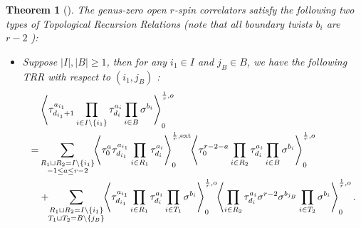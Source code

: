 \documentclass[11pt]{amsart}
\newtheorem{thm}[dummy]{Theorem}
\theoremstyle{definition}
\theoremstyle{remark}
\newcommand{\<}{\left<}
\renewcommand{\>}{\right>}
\numberwithin{equation}{section}
\begin{document}
    \begin{thm}[{\cite[Theorem 4.1]{BCT2}}]\label{thm TRR BCT}
    The genus-zero open $r$-spin correlators satisfy the following two types of Topological Recursion Relations (note that all boundary twists $b_i$ are $r-2$%
):
\begin{itemize}
\item[(a)] Suppose $\lvert I \rvert, \lvert B \rvert\ge 1$, then for any $i_1\in I$ and $j_B\in B$, we have the following %
TRR with respect to $(i_1,j_B)$%
:
\begin{equation}\label{eq: bct trr 1}
\begin{split}
&\left\langle \tau_{d_{i_1}+1}^{a_{i_1}}\prod_{i\in I\setminus \{i_1\}}\tau^{a_i}_{d_i}\prod_{i\in B}\sigma^{b_i}\right\rangle^{\frac{1}{r},o}_0\hspace{-0.2cm}\\
=&\sum_{\substack{R_1 \sqcup R_2 = I \setminus \{{i_1}\}\\ -1\le a \le r-2}}\hspace{-0.1cm}\left\langle \tau_0^{a}\tau_{d_{i_1}}^{a_{i_1}}\prod_{i \in R_1}\tau_{d_i}^{a_i}\right\rangle^{\frac{1}{r},\text{ext}}_0
\hspace{-0.1cm}\left\langle \tau_0^{r-2-a}\prod_{i\in R_2}\tau^{a_i}_{d_i}\prod_
{i\in B}\sigma^{b_i}\right\rangle^{\frac{1}{r},o}_0\\
&+\hspace{-0.1cm}\sum_{\substack{R_1 \sqcup R_2 =  I \setminus \{{i_1}\} \\ T_1 \sqcup T_2 = B\setminus \{j_B\}}} \hspace{-0.1cm} \left\langle \tau^{a_{i_1}}_{d_{i_1}}\prod_{i \in R_1} \tau^{a_i}_{d_i}\prod_{i\in T_1}\sigma^{b_i}\right\rangle^{\frac{1}{r},o}_0 \hspace{-0.1cm}\left\langle \prod_{i \in R_2} \tau^{a_i}_{d_i} \sigma^{r-2}\sigma^{b_{j_B}}\prod_{i\in T_2}\sigma^{b_i}\right\rangle^{\frac{1}{r}, o}_0.
    \end{split}
\end{equation}


\end{itemize}
\end{thm}
\end{document}
